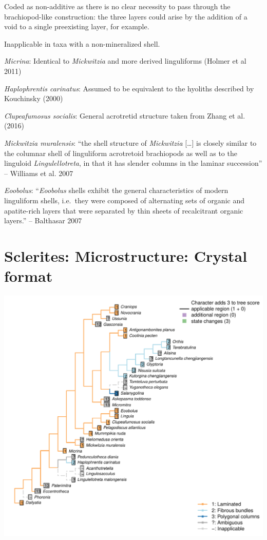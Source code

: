 \documentclass[]{book}
\theoremstyle{definition}
\theoremstyle{definition}
\theoremstyle{definition}
\theoremstyle{remark}
\begin{document}
Coded as non-additive as there is no clear necessity to pass through the
brachiopod-like construction: the three layers could arise by the
addition of a void to a single preexisting layer, for example.

Inapplicable in taxa with a non-mineralized shell.

\emph{Micrina}: Identical to \emph{Mickwitzia} and more derived
linguliforms (Holmer et al 2011)

\emph{Haplophrentis carinatus}: Assumed to be equivalent to the hyoliths
described by Kouchinsky (2000)

\emph{Clupeafumosus socialis}: General acrotretid structure taken from
Zhang et al. (2016)

\emph{Mickwitzia muralensis}: ``the shell structure of \emph{Mickwitzia}
{[}\ldots{}{]} is closely similar to the columnar shell of linguliform
acrotretoid brachiopods as well as to the linguloid
\emph{Lingulellotreta}, in that it has slender columns in the laminar
succession'' -- Williams et al. 2007

\emph{Eoobolus}: ``\emph{Eoobolus} shells exhibit the general
characteristics of modern linguliform shells, i.e.~they were composed of
alternating sets of organic and apatite-rich layers that were separated
by thin sheets of recalcitrant organic layers.'' -- Balthasar 2007

\hypertarget{sclerites-microstructure-crystal-format}{%
\section*{Sclerites: Microstructure: Crystal
format}\label{sclerites-microstructure-crystal-format}}

\includegraphics{Brachiopod_phylogeny_files/figure-latex/unnamed-chunk-5-55.pdf}
\end{document}
